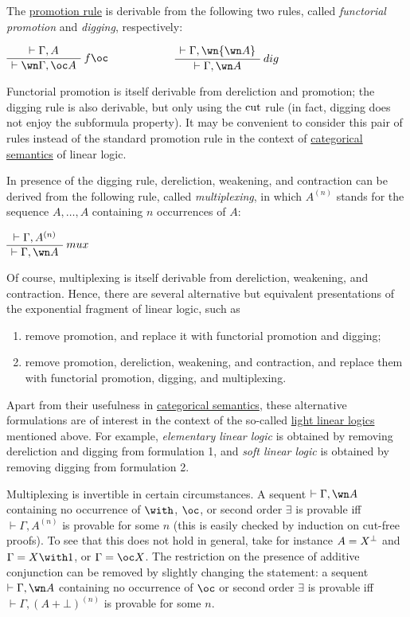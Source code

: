 The \href{Sequent_calculus\#Sequents_and_proofs}{promotion rule} is
derivable from the following two rules, called \emph{functorial
promotion} and \emph{digging}, respectively:

\(\AxRule{\vdash\Gamma,A}
\LabelRule{f\oc}
\UnaRule{\vdash\wn\Gamma,\oc A}
\DisplayProof
\qquad\qquad\qquad
\AxRule{\vdash\Gamma,\wn{\wn A}}
\LabelRule{dig}
\UnaRule{\vdash\Gamma,\wn A}
\DisplayProof\)

Functorial promotion is itself derivable from dereliction and promotion;
the digging rule is also derivable, but only using the
\(\operatorname{cut}\) rule (in fact, digging does not enjoy the subformula
property). It may be convenient to consider this pair of rules instead
of the standard promotion rule in the context of
\href{categorical_semantics}{categorical semantics} of linear logic.

In presence of the digging rule, dereliction, weakening, and contraction
can be derived from the following rule, called \emph{multiplexing}, in
which \(A^{(n)}\) stands for the sequence \(A,\ldots,A\) containing
\(n\) occurrences of \(A\):

\(\AxRule{\vdash\Gamma,A^{(n)}}
\LabelRule{mux}
\UnaRule{\vdash\Gamma,\wn A}
\DisplayProof\)

Of course, multiplexing is itself derivable from dereliction, weakening,
and contraction. Hence, there are several alternative but equivalent
presentations of the exponential fragment of linear logic, such as

\begin{enumerate}
\tightlist
\item
  remove promotion, and replace it with functorial promotion and
  digging;
\item
  remove promotion, dereliction, weakening, and contraction, and replace
  them with functorial promotion, digging, and multiplexing.
\end{enumerate}

Apart from their usefulness in \href{categorical_semantics}{categorical
semantics}, these alternative formulations are of interest in the
context of the so-called \href{light_linear_logics}{light linear logics}
mentioned above. For example, \emph{elementary linear logic} is obtained
by removing dereliction and digging from formulation 1, and \emph{soft
linear logic} is obtained by removing digging from formulation 2.

Multiplexing is invertible in certain circumstances. A sequent
\(\vdash\Gamma,\wn A\) containing no occurrence of \(\with\), \(\oc\),
or second order \(\exists\) is provable iff \(\vdash\Gamma,A^{(n)}\) is
provable for some \(n\) (this is easily checked by induction on cut-free
proofs). To see that this does not hold in general, take for instance
\(A=X^\bot\) and \(\Gamma=X\with\one\), or \(\Gamma=\oc X\). The
restriction on the presence of additive conjunction can be removed by
slightly changing the statement: a sequent \(\vdash\Gamma,\wn A\)
containing no occurrence of \(\oc\) or second order \(\exists\) is
provable iff \(\vdash\Gamma,(A\plus\bot)^{(n)}\) is provable for some
\(n\).

